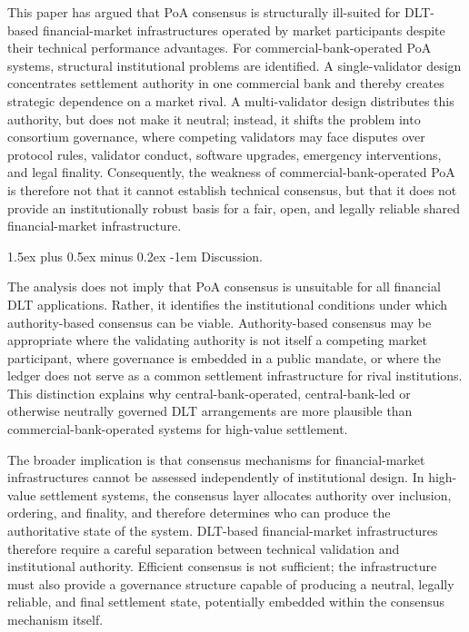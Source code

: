 \documentclass[
reprint,
showkeys,
superscriptaddress,
aps,
pra,
longbibliography,
nofootinbib,
]{revtex4-2}
\makeatletter
\theoremstyle{definition}\newtheorem{definition}{Definition}
\renewcommand\paragraph{%
	\@startsection{paragraph}{4}{\z@}%
	{1.5ex plus 0.5ex minus 0.2ex}%
	{-1em}%
	{\normalfont\normalsize\bfseries}%
}
\makeatother
\begin{document}
This paper has argued that PoA consensus is structurally ill-suited for DLT-based financial-market infrastructures operated by market participants despite their technical performance advantages. 
For commercial-bank-operated PoA systems, structural institutional problems are identified. 
A single-validator design concentrates settlement authority in one commercial bank and thereby creates strategic dependence on a market rival. 
A multi-validator design distributes this authority, but does not make it neutral; instead, it shifts the problem into consortium governance, where competing validators may face disputes over protocol rules, validator conduct, software upgrades, emergency interventions, and legal finality. 
Consequently, the weakness of commercial-bank-operated PoA is therefore not that it cannot establish technical consensus, but that it does not provide an institutionally robust basis for a fair, open, and legally reliable shared financial-market infrastructure.


\paragraph{Discussion.}

The analysis does not imply that PoA consensus is unsuitable for all financial DLT applications. 
Rather, it identifies the institutional conditions under which authority-based consensus can be viable. 
Authority-based consensus may be appropriate where the validating authority is not itself a competing market participant, where governance is embedded in a public mandate, or where the ledger does not serve as a common settlement infrastructure for rival institutions. 
This distinction explains why central-bank-operated, central-bank-led or otherwise neutrally governed DLT arrangements are more plausible than commercial-bank-operated systems for high-value settlement.



The broader implication is that consensus mechanisms for financial-market infrastructures cannot be assessed independently of institutional design.
In high-value settlement systems, the consensus layer allocates authority over inclusion, ordering, and finality, and therefore determines who can produce the authoritative state of the system.
DLT-based financial-market infrastructures therefore require a careful separation between technical validation and institutional authority. Efficient consensus is not sufficient; the infrastructure must also provide a governance structure capable of producing a neutral, legally reliable, and final settlement state, potentially embedded within the consensus mechanism itself.
\end{document}
